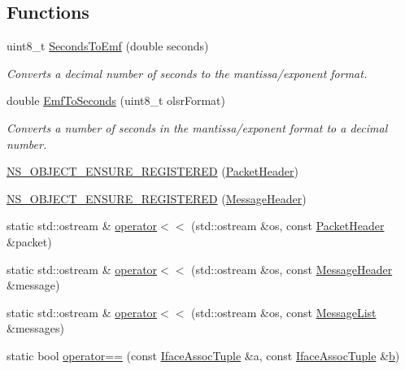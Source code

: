 \subsection*{Functions}
\begin{DoxyCompactItemize}
\item 
uint8\+\_\+t \hyperlink{namespacens3_1_1olsr_aa544b806b38a4a63280ce21a9b706628}{Seconds\+To\+Emf} (double seconds)
\begin{DoxyCompactList}\small\item\em Converts a decimal number of seconds to the mantissa/exponent format. \end{DoxyCompactList}\item 
double \hyperlink{namespacens3_1_1olsr_a6d7d7cac3867eec9f70686ab69f1ded6}{Emf\+To\+Seconds} (uint8\+\_\+t olsr\+Format)
\begin{DoxyCompactList}\small\item\em Converts a number of seconds in the mantissa/exponent format to a decimal number. \end{DoxyCompactList}\item 
\hyperlink{namespacens3_1_1olsr_a8ab14d3afb0e0ca3b550d000562d49c3}{N\+S\+\_\+\+O\+B\+J\+E\+C\+T\+\_\+\+E\+N\+S\+U\+R\+E\+\_\+\+R\+E\+G\+I\+S\+T\+E\+R\+ED} (\hyperlink{classns3_1_1olsr_1_1PacketHeader}{Packet\+Header})
\item 
\hyperlink{namespacens3_1_1olsr_a3225239f668cbd69876b19cad79fa439}{N\+S\+\_\+\+O\+B\+J\+E\+C\+T\+\_\+\+E\+N\+S\+U\+R\+E\+\_\+\+R\+E\+G\+I\+S\+T\+E\+R\+ED} (\hyperlink{classns3_1_1olsr_1_1MessageHeader}{Message\+Header})
\item 
static std\+::ostream \& \hyperlink{namespacens3_1_1olsr_afa34aff519277684925d5b636843b396}{operator$<$$<$} (std\+::ostream \&os, const \hyperlink{classns3_1_1olsr_1_1PacketHeader}{Packet\+Header} \&packet)
\item 
static std\+::ostream \& \hyperlink{namespacens3_1_1olsr_ac6b1343516e83c29a4139d7d8fb65eea}{operator$<$$<$} (std\+::ostream \&os, const \hyperlink{classns3_1_1olsr_1_1MessageHeader}{Message\+Header} \&message)
\item 
static std\+::ostream \& \hyperlink{namespacens3_1_1olsr_a952f55340bd0ab5ae0cd5f462cf91fe4}{operator$<$$<$} (std\+::ostream \&os, const \hyperlink{namespacens3_1_1olsr_af17c710718a5637d01f37804a0a53e78}{Message\+List} \&messages)
\item 
static bool \hyperlink{namespacens3_1_1olsr_a1bbb2f5032653940e75a0090956c7c7d}{operator==} (const \hyperlink{structns3_1_1olsr_1_1IfaceAssocTuple}{Iface\+Assoc\+Tuple} \&a, const \hyperlink{structns3_1_1olsr_1_1IfaceAssocTuple}{Iface\+Assoc\+Tuple} \&\hyperlink{lte__pathloss_8m_a21ad0bd836b90d08f4cf640b4c298e7c}{b})

\end{DoxyCompactItemize}

